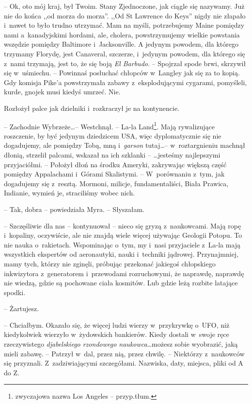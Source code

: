 \documentclass[oneside,polish,11pt,sfheadings]{mwbk}
\begin{document}
-- Ok, oto mój kraj, był Twoim.
Stany Zjednoczone, jak ciągle się nazywamy. Już nie do końca ,,od morza
do morza''. ,,Od St Lawrence do Keys'' nigdy nie złapało i~nawet to było
trudno utrzymać. Mam na myśli, potrzebujemy Maine pomiędzy nami a~kanadyjskimi hordami, ale, cholera, powstrzymujemy wielkie powstania
wszędzie pomiędzy Baltimore i~Jacksonville. A jedynym powodem, dla
którego trzymamy Florydę, jest Canaveral, szczerze, i~jedynym powodem,
dla którego się z~nami trzymają, jest to, że się boją \textit{El Barbudo}.
-- Spojrzał spode brwi, skrzywił się w~uśmiechu. -- Powinnaś posłuchać
chłopców w~Langley jak się za to kopią. Gdy komisja Pike'a powstrzymała
zabawy z~eksplodującymi cygarami, pomyśleli, kurde, gnojek musi kiedyś
umrzeć. Nie.

Rozłożył palce jak dzielniki i~rozkraczył je na kontynencie. 

-- Zachodnie Wybrzeże\ldots -- Westchnął. -- La-la Land\footnote{ zwyczajowa nazwa Los Angeles -- przyp.tłum.}. Mają rywalizujące roszczenie, by być jedynym dziedzicem
USA, więc dyplomatycznie się nie dogadujemy, ale pomiędzy Tobą, mną i~\textit{garson} tutaj\ldots -- w~roztargnieniu machnął dłonią, strzelił
palcami, wskazał na ich szklanki -- \ldots jesteśmy najlepszymi
przyjaciółmi. -- Położył dłoń na środku Ameryki, zakrywając większą część
pomiędzy Appalachami i~Górami Skalistymi. -- W~porównaniu z~tym, jak
dogadujemy się z~resztą. Mormoni, milicje, fundamentaliści, Biała
Prawica, Indianie, wymień je, straciliśmy wobec nich.

-- Tak, dobra -- powiedziała Myra. -- Słyszałam.

-- Szczęśliwie dla nas -- kontynuował -- nieco się gryzą z~naukowcami. Mają
ropę i~kopaliny, oczywiście, ale nie znajdą wiele więcej używając
Geologii Potopu. To nie nauka o~rakietach. Wspominając o~tym, my i~nasi
przyjaciele z~La-la mają wszystkich ekspertów od aeronautyki, nauki i~techniki jądrowej. Przynajmniej, mamy tych, którzy nie zginęli, próbując
przekonać jakiegoś chłopskiego inkwizytora z~generatorem i~przewodami
rozruchowymi, że naprawdę, naprawdę nie wiedzą, gdzie są pochowane ciała
kosmitów. Lub gdzie leżą rozbite latające spodki.

-- Żartujesz.

-- Chciałbym. Okazało się, że więcej ludzi wierzy w~przykrywkę o~UFO, niż
kiedykolwiek wierzyło w~żydowskich bankierów. Kiedy dostali w~swoje ręce
rzeczywistego \textit{djabelskiego rzondowego naukowca}\ldots możesz sobie
wyobrazić, jaką mieli zabawę. -- Patrzył w~dal, przez nią, przez chwilę.
-- Niektórzy z~naukowców się przyznali. Z~zadziwiającymi szczegółami.
Nazwiska, daty, miejsca, pliki od A do Z.
\end{document}

